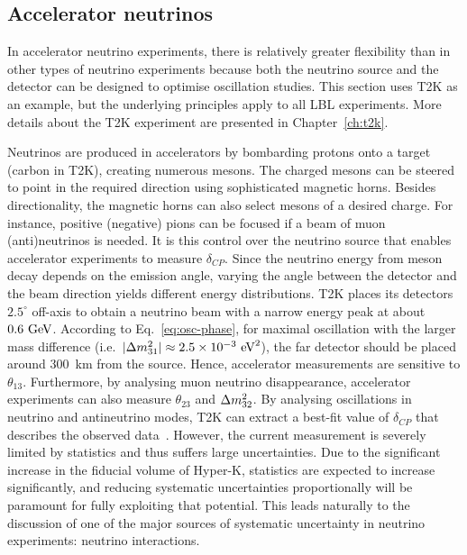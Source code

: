 \subsection{Accelerator neutrinos}
In accelerator neutrino experiments, there is relatively greater flexibility than in other types of neutrino experiments because both the neutrino source and the detector can be designed to optimise oscillation studies.
This section uses T2K as an example, but the underlying principles apply to all LBL experiments.
More details about the T2K experiment are presented in Chapter~\ref{ch:t2k}.

Neutrinos are produced in accelerators by bombarding protons onto a target (carbon in T2K), creating numerous mesons.
The charged mesons can be steered to point in the required direction using sophisticated magnetic horns.
Besides directionality, the magnetic horns can also select mesons of a desired charge.
For instance, positive (negative) pions can be focused if a beam of muon (anti)neutrinos is needed.
It is this control over the neutrino source that enables accelerator experiments to measure $\delta_{CP}$.
Since the neutrino energy from meson decay depends on the emission angle, varying the angle between the detector and the beam direction yields different energy distributions.
T2K places its detectors $2.5^\circ$ off-axis to obtain a neutrino beam with a narrow energy peak at about $0.6~\textrm{GeV}$.
According to Eq.~\ref{eq:osc-phase}, for maximal oscillation with the larger mass difference (i.e.\ $|\Delta m^2_{31}| \approx 2.5 \times 10^{-3}~\textrm{eV}^2$), the far detector should be placed around $300$~km from the source.
Hence, accelerator measurements are sensitive to $\theta_{13}$.
Furthermore, by analysing muon neutrino disappearance, accelerator experiments can also measure $\theta_{23}$ and $\Delta m^2_{32}$.
By analysing oscillations in neutrino and antineutrino modes, T2K can extract a best-fit value of $\delta_{CP}$ that describes the observed data~\cite{T2K:2019bcf}.
However, the current measurement is severely limited by statistics and thus suffers large uncertainties.
Due to the significant increase in the fiducial volume of Hyper-K, statistics are expected to increase significantly, and reducing systematic uncertainties proportionally will be paramount for fully exploiting that potential.
This leads naturally to the discussion of one of the major sources of systematic uncertainty in neutrino experiments: neutrino interactions.

